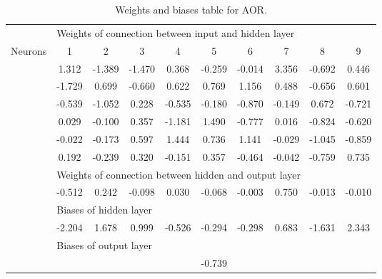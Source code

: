 \begin{table}[htbp] 
 \centering 
\begin{tabular}{l|ccccccccc} 
 \hline 
   &    \multicolumn{9}{l}{Weights of connection between input and hidden layer}  \\ 
 Neurons & 1 &  2 &  3 &  4 &  5 &  6 &  7 &  8 & 9 \\ 
 \hline 
  & 1.312 &  -1.389 &  -1.470 &  0.368 &  -0.259 &  -0.014 &  3.356 &  -0.692 &  0.446 \\ 
  & -1.729 &  0.699 &  -0.660 &  0.622 &  0.769 &  1.156 &  0.488 &  -0.656 &  0.601 \\ 
  & -0.539 &  -1.052 &  0.228 &  -0.535 &  -0.180 &  -0.870 &  -0.149 &  0.672 &  -0.721 \\ 
  & 0.029 &  -0.100 &  0.357 &  -1.181 &  1.490 &  -0.777 &  0.016 &  -0.824 &  -0.620 \\ 
  & -0.022 &  -0.173 &  0.597 &  1.444 &  0.736 &  1.141 &  -0.029 &  -1.045 &  -0.859 \\ 
  & 0.192 &  -0.239 &  0.320 &  -0.151 &  0.357 &  -0.464 &  -0.042 &  -0.759 &  0.735 \\ 
\hline 
   &    \multicolumn{9}{l}{Weights of connection between hidden and output layer}  \\ 
  & -0.512 &  0.242 &  -0.098 &  0.030 &  -0.068 &  -0.003 &  0.750 &  -0.013 &  -0.010 \\ 
\hline 
   &    \multicolumn{9}{l}{Biases of hidden layer}  \\ 
  & -2.204 &  1.678 &  0.999 &  -0.526 &  -0.294 &  -0.298 &  0.683 &  -1.631 &  2.343 \\ 
\hline 
   &    \multicolumn{9}{l}{Biases of output layer}  \\ 
 &    \multicolumn{9}{c}{-0.739}  \\ 
\hline 
 \end{tabular} 
\caption[Weights and biases table for AOR]{Weights and biases table for AOR.} 
\label{tab:32weightsbiasesAOR} 
\end{table}